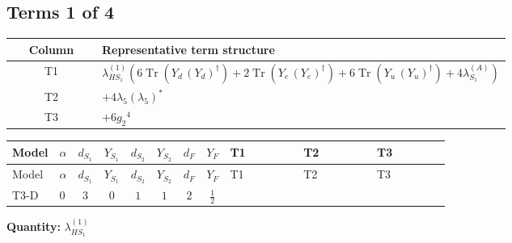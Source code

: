\documentclass[8pt]{article}
\begin{document}
\begin{landscape}
\subsection*{Terms 1 of 4}
\begin{center}
\begin{tabular}{@{}c >{\raggedright\arraybackslash}p{0.82\linewidth}@{}}
\toprule
Column & Representative term structure \\
\midrule
T1 & \(\displaystyle {\lambda_{HS_1}^{(1)}} (6 \operatorname{Tr}\!\left({Y_d}\,\left({Y_d}\right)^{\dagger}\right)+2 \operatorname{Tr}\!\left({Y_e}\,\left({Y_e}\right)^{\dagger}\right)+6 \operatorname{Tr}\!\left({Y_u}\,\left({Y_u}\right)^{\dagger}\right)+4 {\lambda_{S_1}^{(A)}})\) \\
\midrule
T2 & \(\displaystyle +4 {\lambda_5} \left({\lambda_5}\right)^{*}\) \\
\midrule
T3 & \(\displaystyle +6 {g_2}^4\) \\
\midrule
\bottomrule
\end{tabular}
\end{center}
\smallskip
\tiny
\begin{longtable}{@{}llcccccc >{\raggedright\arraybackslash}p{0.21\linewidth} >{\raggedright\arraybackslash}p{0.21\linewidth} >{\raggedright\arraybackslash}p{0.21\linewidth}@{}}
\toprule
Model & $\alpha$ & $d_{S_1}$ & $Y_{S_1}$ & $d_{S_2}$ & $Y_{S_2}$ & $d_F$ & $Y_F$ & T1 & T2 & T3 \\
\midrule
\endfirsthead
\toprule
Model & $\alpha$ & $d_{S_1}$ & $Y_{S_1}$ & $d_{S_2}$ & $Y_{S_2}$ & $d_F$ & $Y_F$ & T1 & T2 & T3 \\
\midrule
\endhead
T3-D & $0$ & $3$ & $0$ & $1$ & $1$ & $2$ & $\frac{1}{2}$ & \scriptsize\adjustbox{max width=\linewidth}{$\begin{gathered} {\lambda_{HS_1}^{(1)}} (6 \operatorname{Tr}\!\left({Y_d}\,\left({Y_d}\right)^{\dagger}\right)+2 \operatorname{Tr}\!\left({Y_e}\,\left({Y_e}\right)^{\dagger}\right)+6 \operatorname{Tr}\!\left({Y_u}\,\left({Y_u}\right)^{\dagger}\right)+4 {\lambda_{S_1}^{(A)}})\end{gathered}$} & \scriptsize\adjustbox{max width=\linewidth}{$\begin{gathered} +4 {\lambda_5} \left({\lambda_5}\right)^{*}\end{gathered}$} & \scriptsize\adjustbox{max width=\linewidth}{$\begin{gathered} +6 {g_2}^4\end{gathered}$} \\
\midrule
\bottomrule
\end{longtable}
\clearpage
\noindent\textbf{Quantity: }$\lambda_{HS_1}^{(1)}$\par\smallskip

\end{landscape}
\end{document}
